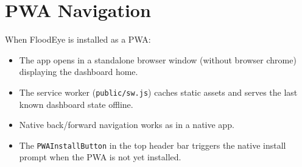 \section{PWA Navigation}

When FloodEye is installed as a PWA:
\begin{itemize}[leftmargin=1.5em]
  \item The app opens in a standalone browser window (without browser chrome) displaying the dashboard home.
  \item The service worker (\texttt{public/\allowbreak{}sw.\allowbreak{}js}) caches static assets and serves the last known dashboard state offline.
  \item Native back/forward navigation works as in a native app.
  \item The \texttt{PWAInstallButton} in the top header bar triggers the native install prompt when the PWA is not yet installed.
\end{itemize}
